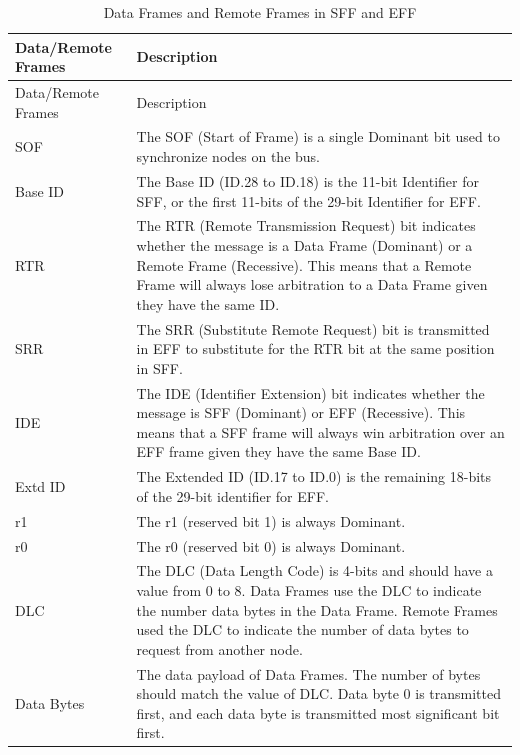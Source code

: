 \documentclass[main\_\_EN.tex]{subfiles}
\begin{document}
\begin{longtable}[c]{|p{3.5cm}|p{12cm}|}

  \caption{Data Frames and Remote Frames in SFF and EFF}
  \label{table:Data Frames and Remote Frames}
  \\\hline
  \rowcolor{lightgray}
  {Data/Remote Frames} & {Description}
  \\\hline
  \endfirsthead

  \hline
  \rowcolor{lightgray}
   {Data/Remote Frames} & {Description}
   \\\hline
  \endhead
  \endfoot
  \hline
  \endlastfoot

    SOF & The SOF (Start of Frame) is a single Dominant bit used to synchronize nodes on the bus.
          \\\hline
    Base ID & The Base ID (ID.28 to ID.18) is the 11-bit Identifier for SFF, or the first 11-bits of the 29-bit Identifier for EFF.                     \\\hline
    RTR & The RTR (Remote Transmission Request) bit indicates whether the message is a Data Frame (Dominant) or a Remote Frame (Recessive). This means that a Remote Frame will always lose arbitration to a Data Frame given they have the same ID.                                               \\\hline
    SRR & The SRR (Substitute Remote Request) bit is transmitted in EFF to substitute for the RTR bit at the same position in SFF.                       \\\hline
    IDE & The IDE (Identifier Extension) bit indicates whether the message is SFF (Dominant) or EFF (Recessive). This means that a SFF frame will always win arbitration over an EFF frame given they have the same Base ID.                       \\\hline
    Extd ID & The Extended ID (ID.17 to ID.0) is the remaining 18-bits of the 29-bit identifier for EFF.                                                \\\hline
    r1 & The r1 (reserved bit 1) is always Dominant.
             \\\hline
    r0 & The r0 (reserved bit 0) is always Dominant.
             \\\hline
    DLC & The DLC (Data Length Code) is 4-bits and should have a value from 0 to 8. Data Frames use the DLC to indicate the number data bytes in the Data Frame. Remote Frames used the DLC to indicate the number of data bytes to request from another node.
             \\\hline
    Data Bytes & The data payload of Data Frames. The number of bytes should match the value of DLC. Data byte 0 is transmitted first, and each data byte is transmitted most significant bit first.

\end{longtable}
\end{document}
